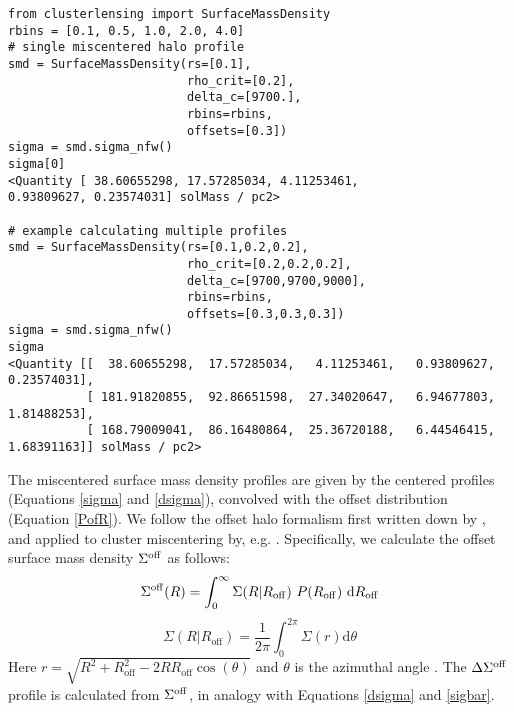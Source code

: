 \documentclass[twocolumn]{aastex6}
\begin{document}
\begin{lstlisting}
from clusterlensing import SurfaceMassDensity
rbins = [0.1, 0.5, 1.0, 2.0, 4.0]
# single miscentered halo profile
smd = SurfaceMassDensity(rs=[0.1], 
                         rho_crit=[0.2], 
                         delta_c=[9700.], 
                         rbins=rbins,
                         offsets=[0.3])
sigma = smd.sigma_nfw()
sigma[0]
<Quantity [ 38.60655298, 17.57285034, 4.11253461, 
0.93809627, 0.23574031] solMass / pc2>

# example calculating multiple profiles
smd = SurfaceMassDensity(rs=[0.1,0.2,0.2], 
                         rho_crit=[0.2,0.2,0.2], 
                         delta_c=[9700,9700,9000], 
                         rbins=rbins, 
                         offsets=[0.3,0.3,0.3])
sigma = smd.sigma_nfw()
sigma 
<Quantity [[  38.60655298,  17.57285034,   4.11253461,   0.93809627,   0.23574031],
           [ 181.91820855,  92.86651598,  27.34020647,   6.94677803,  1.81488253],
           [ 168.79009041,  86.16480864,  25.36720188,   6.44546415,  1.68391163]] solMass / pc2>
\end{lstlisting}

The miscentered surface mass density profiles are given by the centered profiles (Equations \ref{sigma} and \ref{dsigma}), convolved with the offset distribution (Equation \ref{PofR}). We follow the offset halo formalism first written down by \citet{Yang06}, and applied to cluster miscentering by, e.g. \citet{Johnston07, George12, Ford14, Ford15, Simet16}. Specifically, we calculate the offset surface mass density $\Sigma^{\rm off}$ as follows:
\begin{equation}\label{sigma_off}
\Sigma^{\rm off}(R) = \int_{0}^{\infty} \Sigma(R | R_{\rm off})\ P(R_{\rm off})\ {\rm d}R_{\rm off}
\end{equation}
\begin{equation}\label{sigma_RgivenRoff}
\Sigma(R|R_{\mathrm{off}})=\frac{1}{2\pi}\int_{0}^{2\pi}\Sigma(r) \mathrm{d}\theta
\end{equation}
Here $r = \sqrt{R^2+R_{\mathrm{off}}^2-2RR_{\mathrm{off}}\cos(\theta)}$ and $\theta$ is the azimuthal angle \citep{Yang06}. The $\Delta\Sigma^{\rm off}$ profile is calculated from $\Sigma^{\rm off}$, in analogy with Equations \ref{dsigma} and \ref{sigbar}.
\end{document}
